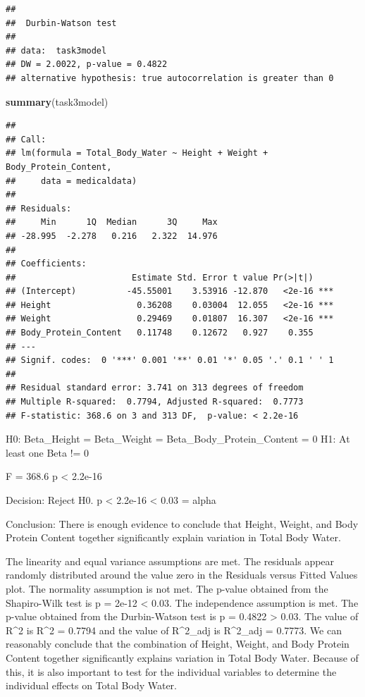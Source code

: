 \documentclass[
]{article}
\newenvironment{Shaded}{\begin{snugshade}}{\end{snugshade}}
\newcommand{\FunctionTok}[1]{\textcolor[rgb]{0.13,0.29,0.53}{\textbf{#1}}}
\newcommand{\NormalTok}[1]{#1}
\begin{document}
\begin{verbatim}
## 
##  Durbin-Watson test
## 
## data:  task3model
## DW = 2.0022, p-value = 0.4822
## alternative hypothesis: true autocorrelation is greater than 0
\end{verbatim}

\begin{Shaded}
\begin{Highlighting}[]
\FunctionTok{summary}\NormalTok{(task3model)}
\end{Highlighting}
\end{Shaded}

\begin{verbatim}
## 
## Call:
## lm(formula = Total_Body_Water ~ Height + Weight + Body_Protein_Content, 
##     data = medicaldata)
## 
## Residuals:
##     Min      1Q  Median      3Q     Max 
## -28.995  -2.278   0.216   2.322  14.976 
## 
## Coefficients:
##                       Estimate Std. Error t value Pr(>|t|)    
## (Intercept)          -45.55001    3.53916 -12.870   <2e-16 ***
## Height                 0.36208    0.03004  12.055   <2e-16 ***
## Weight                 0.29469    0.01807  16.307   <2e-16 ***
## Body_Protein_Content   0.11748    0.12672   0.927    0.355    
## ---
## Signif. codes:  0 '***' 0.001 '**' 0.01 '*' 0.05 '.' 0.1 ' ' 1
## 
## Residual standard error: 3.741 on 313 degrees of freedom
## Multiple R-squared:  0.7794, Adjusted R-squared:  0.7773 
## F-statistic: 368.6 on 3 and 313 DF,  p-value: < 2.2e-16
\end{verbatim}

H0: Beta\_Height = Beta\_Weight = Beta\_Body\_Protein\_Content = 0 H1:
At least one Beta != 0

F = 368.6 p \textless{} 2.2e-16

Decision: Reject H0. p \textless{} 2.2e-16 \textless{} 0.03 = alpha

Conclusion: There is enough evidence to conclude that Height, Weight,
and Body Protein Content together significantly explain variation in
Total Body Water.

The linearity and equal variance assumptions are met. The residuals
appear randomly distributed around the value zero in the Residuals
versus Fitted Values plot. The normality assumption is not met. The
p-value obtained from the Shapiro-Wilk test is p = 2e-12 \textless{}
0.03. The independence assumption is met. The p-value obtained from the
Durbin-Watson test is p = 0.4822 \textgreater{} 0.03. The value of
R\^{}2 is R\^{}2 = 0.7794 and the value of R\^{}2\_adj is R\^{}2\_adj =
0.7773. We can reasonably conclude that the combination of Height,
Weight, and Body Protein Content together significantly explains
variation in Total Body Water. Because of this, it is also important to
test for the individual variables to determine the individual effects on
Total Body Water.
\end{document}
